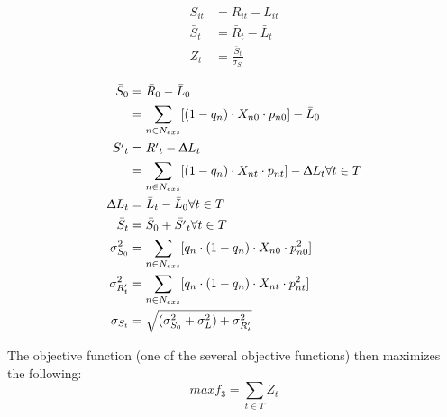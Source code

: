 \documentclass[10pt]{amsart}
\begin{document}
\begin{equation}	
\begin{split}
S_{it} &= R_{it} - L_{it} \\
\bar{S}_{t} &= \bar{R}_{t} - \bar{L}_{t} \\
Z_{t} &= \frac{\bar{S}_{t}}{\sigma_{S_t}}
\end{split}
\end{equation} 

\begin{equation}	
\begin{split}
\bar{S}_{0} &= \bar{R}_{0} - \bar{L}_{0} \\
&= \sum_{n \in N_{exs}} [(1-q_n)\cdot X_{n0} \cdot p_{n0}] - \bar{L}_0 \\
\bar{S'}_{t} &= \bar{R'}_{t} - \Updelta{L}_{t} \\
&= \sum_{n \in N_{exs}} [(1-q_n)\cdot X_{nt} \cdot p_{nt}] - \Updelta{L}_t  \forall t \in T \\
\Updelta{L}_{t} &= \bar{L}_{t} - \bar{L}_{0} \forall t \in T \\
\bar{S}_{t} &= \bar{S}_{0} + \bar{S'}_{t} \forall t \in T \\
\sigma^2_{S_0} &= \sum_{n \in N_{exs}} [q_n \cdot (1-q_n)\cdot X_{n0} \cdot p^2_{n0}] \\
\sigma^2_{R'_t} &= \sum_{n \in N_{exs}} [q_n \cdot (1-q_n)\cdot X_{nt} \cdot p^2_{nt}] \\
\sigma_{S_t} &= \sqrt{(\sigma^2_{S_0} + \sigma^2_{L}) + \sigma^2_{R'_t}}
\end{split}
\end{equation}

The objective function (one of the several objective functions) then maximizes the following: 
\begin{equation}
max f_3 = \sum_{t \in T} Z_t
\end{equation}
\end{document}
